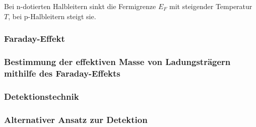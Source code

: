 Bei n-dotierten Halbleitern sinkt die Fermigrenze $E_F$ mit steigender Temperatur $T$, bei p-Halbleitern steigt sie. \cite{demtroeder}

\subsubsection{Faraday-Effekt}




\subsubsection{Bestimmung der effektiven Masse von Ladungsträgern mithilfe des Faraday-Effekts}

\subsubsection{Detektionstechnik}

\subsubsection{Alternativer Ansatz zur Detektion}